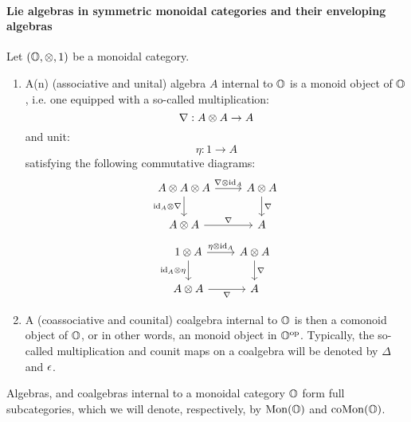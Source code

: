                 \paragraph{Lie algebras in symmetric monoidal categories and their enveloping algebras}
                    \begin{definition} \label{def: algebras_and_coalgebras}
                        Let $(\O, \tensor, 1)$ be a monoidal category. 
                            \begin{enumerate}
                                \item A(n) (associative and unital) algebra $A$ internal to $\mathbb{O}$ is a monoid object of $\mathbb{O}$, i.e. one equipped with a so-called multiplication:
                                    $$\nabla: A \tensor A \to A$$
                                and unit:
                                    $$\eta: 1 \to A$$
                                satisfying the following commutative diagrams:
                                    $$
                                        \begin{tikzcd}
                                        	{A \tensor A \tensor A} & {A \tensor A} \\
                                        	{A \tensor A} & {A}
                                        	\arrow["{\id_A \tensor \nabla}"', from=1-1, to=2-1]
                                        	\arrow["{\nabla}", from=2-1, to=2-2]
                                        	\arrow["{\nabla \tensor \id_A}", from=1-1, to=1-2]
                                        	\arrow["{\nabla}", from=1-2, to=2-2]
                                        \end{tikzcd}
                                    $$
                                    $$
                                        \begin{tikzcd}
                                        	{1 \tensor A} & {A \tensor A} \\
                                        	{A \tensor A} & {A}
                                        	\arrow["{\nabla}", from=1-2, to=2-2]
                                        	\arrow["{\nabla}"', from=2-1, to=2-2]
                                        	\arrow["{\id_A \tensor \eta}"', from=1-1, to=2-1]
                                        	\arrow["{\eta \tensor \id_A}", from=1-1, to=1-2]
                                        \end{tikzcd}
                                    $$
                                \item A (coassociative and counital) coalgebra internal to $\mathbb{O}$ is then a comonoid object of $\mathbb{O}$, or in other words, an monoid object in $\mathbb{O}^{\mathrm{op}}$. Typically, the so-called multiplication and counit maps on a coalgebra will be denoted by $\Delta$ and $\epsilon$.
                            \end{enumerate}
                        Algebras, and coalgebras internal to a monoidal category $\mathbb{O}$ form full subcategories, which we will denote, respectively, by $\mathrm{Mon}(\mathbb{O})$ and $\mathrm{co}\mathrm{Mon}(\mathbb{O})$.
                    \end{definition}

